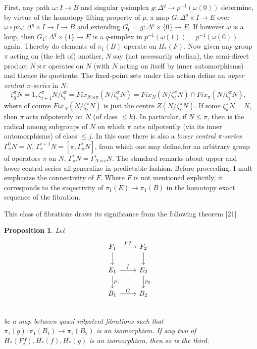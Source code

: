 \documentclass[openany,leqno]{book}  %
\newtheorem{prop}[theorem]{Proposition}
\begin{document}
First, any path $\omega \colon   I\longrightarrow B$ and singular $q$-simplex $g \colon   \Delta^q\longrightarrow p^{-1} (\omega(0))$ determine, by virtue of the homotopy lifting property of $p$, a map $G \colon   \Delta^q \times I\longrightarrow E$ over $\omega \circ pr_2 \colon    \Delta^q \times I \longrightarrow I \longrightarrow  B$ and extending $G_0 = g \colon   \Delta^q \times \{0\} \longrightarrow E$. If however $\omega$ is a loop, then $G_1 \colon  \Delta^q \times \{1\} \longrightarrow E$ is a $q$-simplex in $p^{-1}(\omega(1)) = p^{-1}(\omega(0))$ again. Thereby do elements of $\pi_1(B)$ operate on $H_*(F)$. Now given any group $\pi$ acting on (the left of) another, $N$ say (not necessarily abelian), the semi-direct product $N\rtimes \pi$ operates on $N$ (with $N$ acting on itself by inner automorphisms) and thence its quotients. The fixed-point sets under this action define an {\em upper central $\pi$-series} in $N$:
\[\zeta_0^\pi N=1, \zeta_{i+1}^\pi N/\zeta_i^\pi= Fix_{N\rtimes \pi}(N/\zeta_i^\pi N)=Fix_N(N/\zeta_i^\pi N)\cap Fix_\pi(N/\zeta_i^\pi N),\]
where of course $Fix_N(N/\zeta_i^\pi N)$ is just the centre $Z(N/\zeta_i^\pi N)$. If some $\zeta_k^\pi N = N$\label{page37}, then $\pi$ acts nilpotently on $N$ (of class $\leqslant k$). In particular, if $N \leqslant \pi$, then is the radical among
subgroups of $N$ on which $\pi$ acts nilpotently (via its inner automorphisms) of class $\leqslant j$. In this case there is also a {\em lower central $\pi$-series} $\Gamma_\pi^0 N = N$, $\Gamma_\pi^{i+1}N = [\pi,\Gamma_\pi^i N] $, from which one may define,for an arbitrary group of operators $\pi$ on $N$, $\Gamma_\pi^i N = \Gamma^i_{N\rtimes \pi}N$. The standard remarks about upper and lower central series all generalize in predictable fashion. Before proceeding, I mult emphasize the connectivity of $F$. Where $F$ is not mentioned explicitly, it corresponds to the suqectivity of $\pi_1(E) \longrightarrow \pi_1(B)$ in the homotopy exact sequence of the fibration.

This class of fibrations draws its significance from the following theorem [21]
\begin{prop}
   Let
\[\begin{tikzcd}
F_{1} \arrow{r}{Ff} \arrow{d}       & F_2 \arrow{d}\\
E_1   \arrow{r}{f}  \arrow{d}{p_1}  & E_2 \arrow{d}{p_2}\\
B_1   \arrow{r}{G}                  & B_2\\
\end{tikzcd}\]
be a map between quasi-nilpotent fibrations such that $\pi_1 (g) \colon   \pi_1(B_1) \longrightarrow \pi_1(B_2)$ is an isomorphism. If any two of $H_*(Ff),H_*(f), H_*(g)$ is an isomorphism, then so is the third.
\end{prop}
\end{document}

